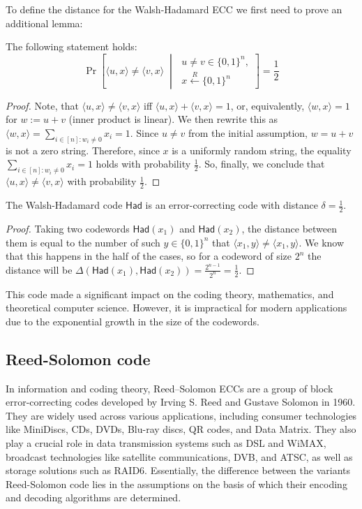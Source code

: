 \documentclass[../lecture-notes-148x210.tex]{subfiles}
\begin{document}
To define the distance for the Walsh-Hadamard ECC we first need to prove an additional lemma:
\begin{lemma}
The following statement holds:
\begin{equation*}
    \Pr\left[\langle u, x \rangle \neq \langle v, x \rangle \;\middle| \;
    \begin{matrix}
        u \neq v \in \{0,1\}^n, \\
        x \xleftarrow{R} \{0,1\}^n
    \end{matrix} \right] = \frac{1}{2}
\end{equation*}
\end{lemma}

\begin{proof}
Note, that $\langle u, x \rangle \neq \langle v, x \rangle$ iff $\langle u, x
\rangle + \langle v, x \rangle = 1$, or, equivalently, $\langle w, x \rangle =
1$ for $w := u+v$ (inner product is linear). We then rewrite this as $\langle w,
x \rangle = \sum_{i \in [n]: w_i \neq 0} x_i = 1$. Since $u \neq v$ from the
initial assumption, $w = u + v$ is not a zero string. Therefore, since $x$ is a
uniformly random string, the equality $\sum_{i \in [n]: w_i \neq 0} x_i = 1$
holds with probability $\frac{1}{2}$. So, finally, we conclude that $\langle u,
x \rangle \neq \langle v, x \rangle$ with probability $\frac{1}{2}$.
\end{proof}
\begin{lemma}
The Walsh-Hadamard code $\mathsf{Had}$ is an error-correcting code with distance $\delta = \frac{1}{2}$.
\end{lemma}
\begin{proof}
Taking two codewords $\mathsf{Had}(x_1)$ and $\mathsf{Had}(x_2)$, the distance
between them is equal to the number of such $y \in \{0, 1\}^n$ that $\langle
x_1, y \rangle \neq \langle x_1, y \rangle$. We know that this happens in the
half of the cases, so for a codeword of size $2^n$ the distance will be
$\Delta(\mathsf{Had}(x_1), \mathsf{Had}(x_2)) = \frac{2^{n-1}}{2^n} =
\frac{1}{2}$.
\end{proof}    
This code made a significant impact on the coding theory, mathematics, and theoretical computer science. However, it is 
impractical for modern applications due to the exponential growth in the size of the codewords.

\subsection{Reed-Solomon code}
In information and coding theory, Reed–Solomon ECCs are a group of block error-correcting codes
developed by Irving S. Reed and Gustave Solomon in 1960. They are widely used across various 
applications, including consumer technologies like MiniDiscs, CDs, DVDs, Blu-ray discs, QR codes, and Data Matrix. They 
also play a crucial role in data transmission systems such as DSL and WiMAX, broadcast technologies like satellite 
communications, DVB, and ATSC, as well as storage solutions such as RAID6. Essentially, the difference between the variants 
Reed-Solomon code lies in the assumptions on the basis of which their encoding and decoding algorithms are determined. 
\end{document}
